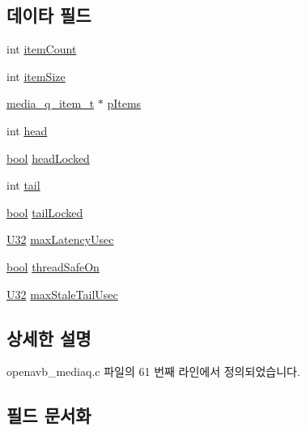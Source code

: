 \subsection*{데이타 필드}
\begin{DoxyCompactItemize}
\item 
int \hyperlink{structmedia__q__info__t_a64154ed2427d248eb1d4aa28aef8daa2}{item\+Count}
\item 
int \hyperlink{structmedia__q__info__t_a42978dc635b477b2a80f5fa2741bb720}{item\+Size}
\item 
\hyperlink{structmedia__q__item__t}{media\+\_\+q\+\_\+item\+\_\+t} $\ast$ \hyperlink{structmedia__q__info__t_adb9655d2d1cff2b1144a0e7ad28eea21}{p\+Items}
\item 
int \hyperlink{structmedia__q__info__t_a20358970b1abaf992eb85e071e454653}{head}
\item 
\hyperlink{avb__gptp_8h_af6a258d8f3ee5206d682d799316314b1}{bool} \hyperlink{structmedia__q__info__t_a6c67b0583525d5d6c4b9c53a67cd5780}{head\+Locked}
\item 
int \hyperlink{structmedia__q__info__t_aff39d864a6594bc5f4a5e365282e00fe}{tail}
\item 
\hyperlink{avb__gptp_8h_af6a258d8f3ee5206d682d799316314b1}{bool} \hyperlink{structmedia__q__info__t_aa27dbfca4e21d38182c8bd9a49341c23}{tail\+Locked}
\item 
\hyperlink{openavb__types__base__pub_8h_a696390429f2f3b644bde8d0322a24124}{U32} \hyperlink{structmedia__q__info__t_acd47d287eb099e2b995adfb4608d34a6}{max\+Latency\+Usec}
\item 
\hyperlink{avb__gptp_8h_af6a258d8f3ee5206d682d799316314b1}{bool} \hyperlink{structmedia__q__info__t_a5b255bb73dcb58b3c4224637b58f42a4}{thread\+Safe\+On}
\item 
\hyperlink{openavb__types__base__pub_8h_a696390429f2f3b644bde8d0322a24124}{U32} \hyperlink{structmedia__q__info__t_a530245db1a2a9b9874d368ae14faa133}{max\+Stale\+Tail\+Usec}
\end{DoxyCompactItemize}


\subsection{상세한 설명}


openavb\+\_\+mediaq.\+c 파일의 61 번째 라인에서 정의되었습니다.



\subsection{필드 문서화}
